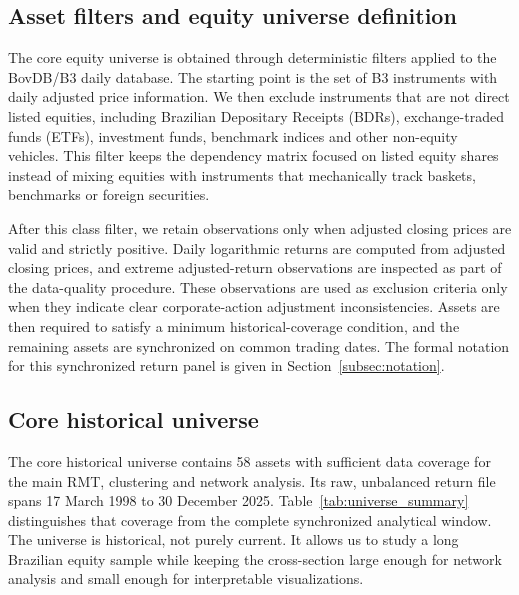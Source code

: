 \subsection{Asset filters and equity universe definition}

The core equity universe is obtained through deterministic filters applied to the BovDB/B3 daily database. The starting point is the set of B3 instruments with daily adjusted price information. We then exclude instruments that are not direct listed equities, including Brazilian Depositary Receipts (BDRs), exchange-traded funds (ETFs), investment funds, benchmark indices and other non-equity vehicles. This filter keeps the dependency matrix focused on listed equity shares instead of mixing equities with instruments that mechanically track baskets, benchmarks or foreign securities.

After this class filter, we retain observations only when adjusted closing prices are valid and strictly positive. Daily logarithmic returns are computed from adjusted closing prices, and extreme adjusted-return observations are inspected as part of the data-quality procedure. These observations are used as exclusion criteria only when they indicate clear corporate-action adjustment inconsistencies. Assets are then required to satisfy a minimum historical-coverage condition, and the remaining assets are synchronized on common trading dates. The formal notation for this synchronized return panel is given in Section~\ref{subsec:notation}.

\subsection{Core historical universe}

The core historical universe contains 58 assets with sufficient data coverage for the main RMT, clustering and network analysis. Its raw, unbalanced return file spans 17 March 1998 to 30 December 2025. Table~\ref{tab:universe_summary} distinguishes that coverage from the complete synchronized analytical window. The universe is historical, not purely current. It allows us to study a long Brazilian equity sample while keeping the cross-section large enough for network analysis and small enough for interpretable visualizations.

\begin{center}
\label{tab:universe_summary}
\end{center}

